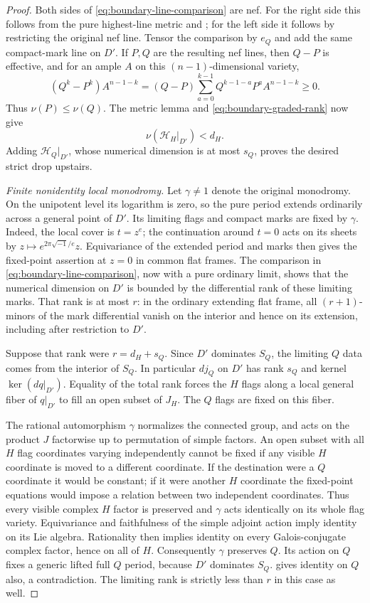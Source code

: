 \begin{proof}
Both sides of \eqref{eq:boundary-line-comparison} are nef.
For the right side this follows from the pure highest-line
metric and ; for the left side it follows
by restricting the original nef line.  Tensor the comparison
by $e_Q$ and add the same compact-mark line on $D'$.  If
$P,Q$ are the resulting nef lines, then $Q-P$ is effective,
and for an ample $A$ on this $(n-1)$-dimensional variety,
\[
 (Q^k-P^k)A^{n-1-k}
  =(Q-P)\sum_{a=0}^{k-1}Q^{k-1-a}P^a A^{n-1-k}\geq0.
\]
Thus $\nu(P)\leq\nu(Q)$.  The metric lemma and
\eqref{eq:boundary-graded-rank} now give
\[
                    \nu(\mathcal H_H|_{D'})<d_H.
\]
Adding $\mathcal H_Q|_{D'}$, whose numerical dimension is
at most $s_Q$, proves the desired strict drop upstairs.

\smallskip\noindent
\emph{Finite nonidentity local monodromy.}\label{proof:finite-boundary}
Let $\gamma\ne1$ denote the original monodromy.  On the
unipotent level its logarithm is zero, so the pure period
extends ordinarily across a general point of $D'$.  Its
limiting flags and compact marks are fixed by $\gamma$.
Indeed, the local cover is $t=z^e$; the continuation around
$t=0$ acts on its sheets by $z\mapsto e^{2\pi\sqrt{-1}/e}z$.
Equivariance of the extended period and marks then gives
the fixed-point assertion at $z=0$ in common flat frames.
The comparison in \eqref{eq:boundary-line-comparison}, now
with a pure ordinary limit, shows that the numerical
dimension on $D'$ is bounded by the differential rank of
these limiting marks.  That rank is at most $r$: in the
ordinary extending flat frame, all $(r+1)$-minors of the
mark differential vanish on the interior and hence on
its extension, including after restriction to $D'$.

Suppose that rank were $r=d_H+s_Q$.  Since $D'$ dominates
$S_Q$, the limiting $Q$ data comes from the interior of
$S_Q$.  In particular $dj_Q$ on $D'$ has rank $s_Q$ and
kernel $\ker(dq|_{D'})$.  Equality of the total rank forces
the $H$ flags along a local general fiber of $q|_{D'}$ to
fill an open subset of $J_H$.  The $Q$ flags are fixed
on this fiber.

The rational automorphism $\gamma$ normalizes the connected
group, and acts on the product $J$ factorwise up to
permutation of simple factors.  An open subset with all
$H$ flag coordinates varying independently cannot be fixed
if any visible $H$ coordinate is moved to a different
coordinate.  If the destination were a $Q$ coordinate it
would be constant; if it were another $H$ coordinate the
fixed-point equations would impose a relation between two
independent coordinates.  Thus every visible complex
$H$ factor is preserved and $\gamma$ acts identically on
its whole flag variety.  Equivariance and faithfulness of
the simple adjoint action imply identity on its Lie
algebra.  Rationality then implies identity on every
Galois-conjugate complex factor, hence on all of $H$.
Consequently $\gamma$ preserves $Q$.  Its action on $Q$
fixes a generic lifted full $Q$ period, because $D'$ dominates
$S_Q$.   gives identity on
$Q$ also, a contradiction.  The limiting rank is strictly
less than $r$ in this case as well.


\end{proof}
